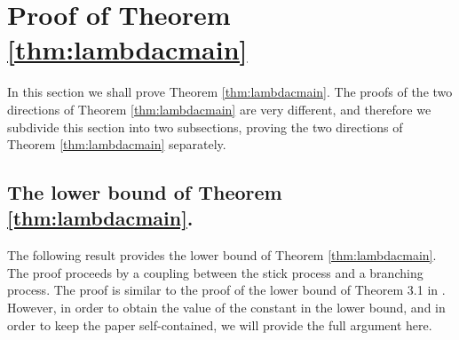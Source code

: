 \documentclass[a4paper,12pt]{article}
\begin{document}
\section{Proof of Theorem \ref{thm:lambdacmain}} \label{sec:lambdac}
In this section we shall prove Theorem \ref{thm:lambdacmain}. The proofs of the two directions
of Theorem \ref{thm:lambdacmain} are very different, and therefore we subdivide this section 
into two subsections, proving the two directions of Theorem \ref{thm:lambdacmain} separately. 

\subsection{The lower bound of Theorem \ref{thm:lambdacmain}.}
The following result provides the lower bound of Theorem \ref{thm:lambdacmain}. The proof 
proceeds by a coupling between the stick process and a branching process.
The proof is similar to the proof of the lower bound of Theorem 3.1 in
\cite{B_22}. However, in order to obtain the value of the constant in the lower bound,
and in order to keep the paper self-contained, we will provide 
the full argument here. 
\end{document}
